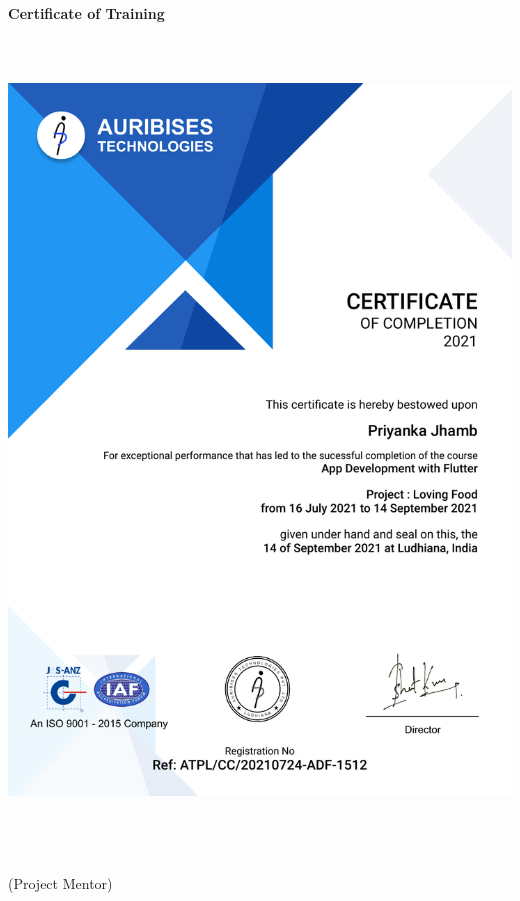 
{\Huge \centering \textbf{Certificate of Training}\\}
\vspace{0.5in}
\includegraphics[width=16cm,height=22cm]{images/certificate.pdf}

\begin{flushright}  
	(Project Mentor)\\
\end{flushright}
